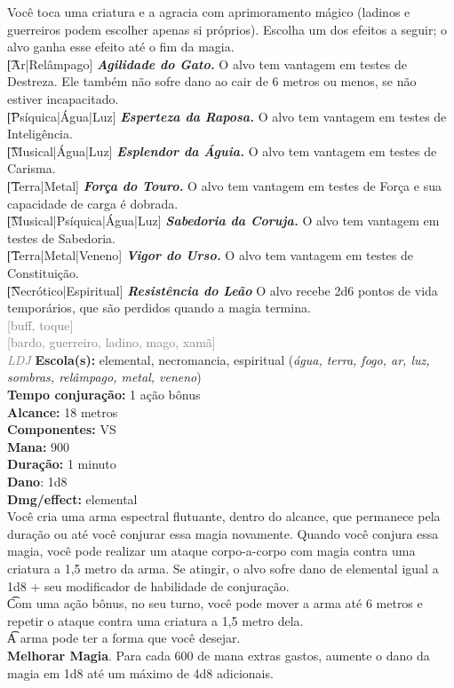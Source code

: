 \documentclass{RPG_Adventure}[2021/10/20]
\begin{document}
{\normalsize Você toca uma criatura e a agracia com aprimoramento mágico (ladinos e guerreiros podem escolher apenas si próprios). Escolha um dos efeitos a seguir; o alvo ganha esse efeito até o fim da magia.\\\t [Ar|Relâmpago] \textbf{\textit{Agilidade do Gato.}} O alvo tem vantagem em testes de Destreza. Ele também não sofre dano ao cair de 6 metros ou menos, se não estiver incapacitado.\\\t [Psíquica|Água|Luz] \textbf{\textit{Esperteza da Raposa.}} O alvo tem vantagem em testes de Inteligência.\\\t [Musical|Água|Luz] \textbf{\textit{Esplendor da Águia.}} O alvo tem vantagem em testes de Carisma.\\\t [Terra|Metal] \textbf{\textit{Força do Touro.}} O alvo tem vantagem em testes de Força e sua capacidade de carga é dobrada.  \\\t [Musical|Psíquica|Água|Luz] \textbf{\textit{Sabedoria da Coruja.}} O alvo tem vantagem em testes de Sabedoria.\\\t [Terra|Metal|Veneno] \textbf{\textit{Vigor do Urso.}} O alvo tem vantagem em testes de Constituição.\\\t [Necrótico|Espiritual] \textbf{\textit{Resistência do Leão}} O alvo recebe 2d6 pontos de vida temporários, que são perdidos quando a magia termina.\\}
{\scriptsize \textcolor{gray}{[buff, toque]\\}}
{\scriptsize \textcolor{gray}{[bardo, guerreiro, ladino, mago, xamã]\\}}
{\tiny \textcolor{gray}{\textit{LDJ}}}\jump{}
{\small \t \textbf{Escola(s):} elemental, necromancia, espiritual (\textit{água, terra, fogo, ar, luz, sombras, relâmpago, metal, veneno})\\\t \textbf{Tempo conjuração:} 1 ação bônus\\\t \textbf{Alcance:} 18 metros\\\t \textbf{Componentes:} VS\\\t \textbf{Mana:} 900\\\t \textbf{Duração:} 1 minuto\\\t \textbf{Dano}: 1d8\\\t \textbf{Dmg/effect:} elemental\\}
{\normalsize Você cria uma arma espectral flutuante, dentro do alcance, que permanece pela duração ou até você conjurar essa magia novamente. Quando você conjura essa magia, você pode realizar um ataque corpo-a-corpo com magia contra uma criatura a 1,5 metro da arma. Se atingir, o alvo sofre dano de elemental igual a 1d8 + seu modificador de habilidade de conjuração.\\\t Com uma ação bônus, no seu turno, você pode mover a arma até 6 metros e repetir o ataque contra uma criatura a 1,5 metro dela.\\\t A arma pode ter a forma que você desejar.\\\t \textbf{Melhorar Magia}. Para cada 600 de mana extras gastos, aumente o dano da magia em 1d8 até um máximo de 4d8 adicionais.\\}
\end{document}
